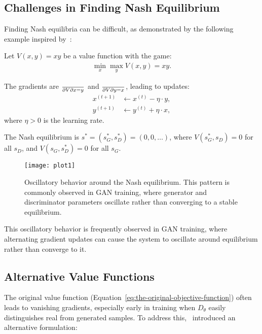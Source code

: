 \subsection{Challenges in Finding Nash Equilibrium}%
\label{sec:difficulty}

Finding Nash equilibria can be difficult, as demonstrated by the following example inspired by~\cite{ref:weng-2017}:

\begin{example}
  Let $V(x, y) = xy$ be a value function with the game:
  \begin{align}
    \min_x \max_y V(x, y) = xy.
  \end{align}

  The gradients are $\over{\partial V}{\partial x} = y$ and $\over{\partial V}{\partial y} = x$, leading to updates:
  \begin{align}
    x^{(t+1)} & \gets x^{(t)} - \eta \cdot y, \\
    y^{(t+1)} & \gets y^{(t)} + \eta \cdot x,
  \end{align}
  where $\eta > 0$ is the learning rate.

  The Nash equilibrium is $s^* = (s_G^*, s_D^*) = (0, 0, \dots)$, where $V(s_G^*, s_D) = 0$ for all $s_D$, and $V(s_G, s_D^*) = 0$ for all $s_G$.

  \begin{figure}[H]
    \centering
    \texttt{[image: plot1]}
    \caption{Oscillatory behavior around the Nash equilibrium. This pattern is commonly observed in GAN training, where generator and discriminator parameters oscillate rather than converging to a stable equilibrium.}%
    \label{fig:alternating}
  \end{figure}
\end{example}

This oscillatory behavior is frequently observed in GAN training, where alternating gradient updates can cause the system to oscillate around equilibrium rather than converge to it.

\subsection{Alternative Value Functions}%
\label{sec:two-value}

The original value function (Equation~\ref{eq:the-original-objective-function}) often leads to vanishing gradients, especially early in training when $D_\theta$ easily distinguishes real from generated samples. To address this,~\cite{ref:goodfellow-original} introduced an alternative formulation:

